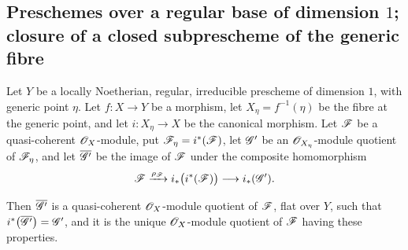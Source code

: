 \subsection{Preschemes over a regular base of dimension
\texorpdfstring{$1$}{1}; closure of a closed subprescheme of the generic
fibre}
\label{subsection:IV.2.8}

\begin{proposition}[2.8.1]
\label{IV.2.8.1}
Let $Y$ be a locally Noetherian, regular, irreducible prescheme of
dimension $1$, with generic point $\eta$. Let $f:X\to Y$ be a
morphism, let $X_\eta=f^{-1}(\eta)$ be the fibre at the generic point,
and let $i:X_\eta\to X$ be the canonical morphism. Let $\mathscr{F}$ be a
quasi-coherent $\mathscr{O}_X$-module, put
$\mathscr{F}_\eta=i^*(\mathscr{F})$, let $\mathscr{G}'$ be an
$\mathscr{O}_{X_\eta}$-module quotient of $\mathscr{F}_\eta$, and let
$\overline{\mathscr{G}'}$ be the image of $\mathscr{F}$ under the composite
homomorphism~
\[
  \mathscr{F}
    \xrightarrow{\rho_{\mathscr{F}}}
  i_*\bigl(i^*(\mathscr{F})\bigr)
    \longrightarrow
  i_*(\mathscr{G}').
\]

Then $\overline{\mathscr{G}'}$ is a quasi-coherent
$\mathscr{O}_X$-module quotient of $\mathscr{F}$, flat over $Y$, such that $i^*\bigl(\overline{\mathscr{G}'}\bigr)=\mathscr{G}'$,
and it is the unique $\mathscr{O}_X$-module quotient of $\mathscr{F}$ having
these properties.
\end{proposition}

